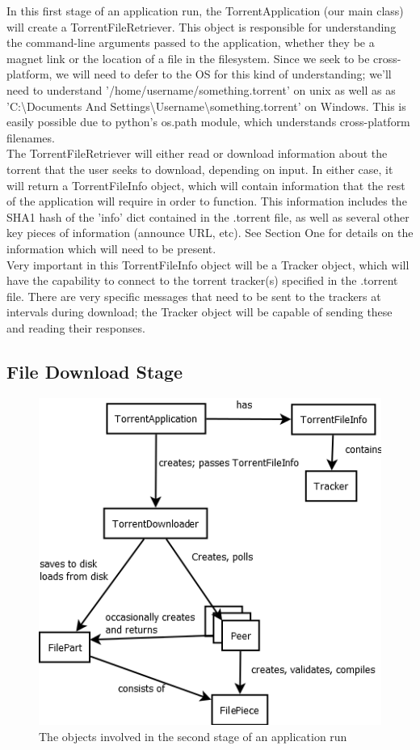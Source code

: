 \documentclass[letter]{scrartcl}
\begin{document}
In this first stage of an application run, the TorrentApplication (our main class) will create a TorrentFileRetriever.  This object is responsible for understanding the command-line arguments passed to the application, whether they be a magnet link or the location of a file in the filesystem.  Since we seek to be cross-platform, we will need to defer to the OS for this kind of understanding; we'll need to understand '/home/username/something.torrent' on unix as well as as 'C:\textbackslash Documents And Settings\textbackslash Username\textbackslash something.torrent' on Windows.  This is easily possible due to python's os.path module, which understands cross-platform filenames.\\

The TorrentFileRetriever will either read or download information about the torrent that the user seeks to download, depending on input.  In either case, it will return a TorrentFileInfo object, which will contain information that the rest of the application will require in order to function.  This information includes the SHA1 hash of the 'info' dict contained in the .torrent file, as well as several other key pieces of information (announce URL, etc).  See Section One for details on the information which will need to be present.\\

Very important in this TorrentFileInfo object will be a Tracker object, which will have the capability to connect to the torrent tracker(s) specified in the .torrent file.  There are very specific messages that need to be sent to the trackers at intervals during download; the Tracker object will be capable of sending these and reading their responses.

\subsection{File Download Stage}

\begin{figure}[h]
\centering
\includegraphics[scale=.5]{stepTwo.png}
\caption{The objects involved in the second stage of an application run}
\end{figure}
\end{document}
